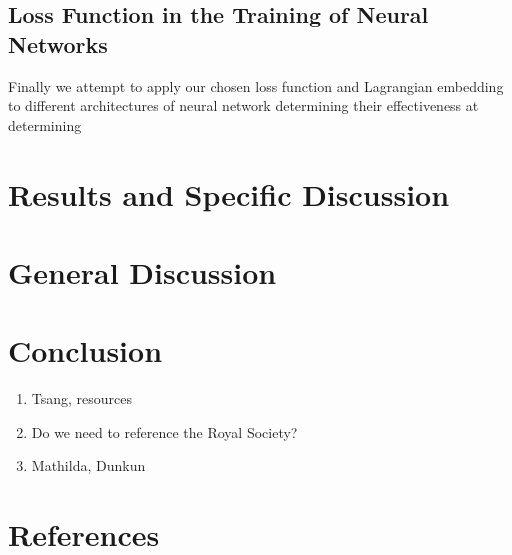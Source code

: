 \documentclass[10pt]{iopart}
\begin{document}


\subsection{Loss Function in the Training of Neural Networks}

Finally we attempt to apply our chosen loss function and Lagrangian embedding to different architectures of neural network determining their effectiveness at determining

\section{Results and Specific Discussion}


\section{General Discussion}



\section{Conclusion}

\ack

\begin{enumerate}
	\item Tsang, resources
	\item Do we need to reference the Royal Society?
	\item Mathilda, Dunkun
\end{enumerate}

\section*{References}


\end{document}
